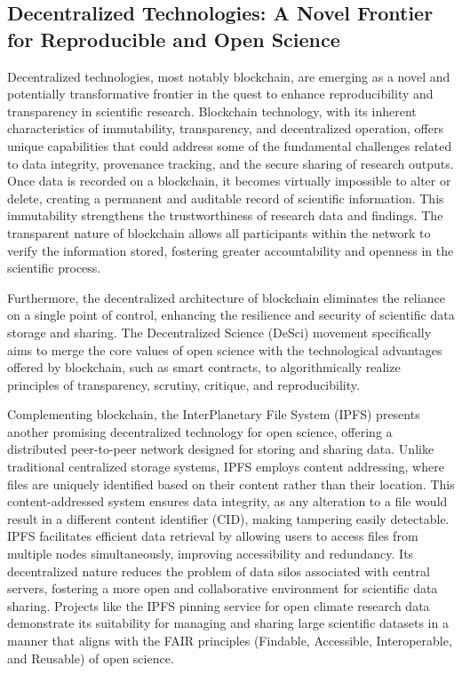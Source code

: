 \documentclass{article}
\begin{document}
\subsection{Decentralized Technologies: A Novel Frontier for Reproducible and Open Science}

Decentralized technologies, most notably blockchain, are emerging as a novel and potentially transformative frontier in the quest to enhance reproducibility and transparency in scientific research. Blockchain technology, with its inherent characteristics of immutability, transparency, and decentralized operation, offers unique capabilities that could address some of the fundamental challenges related to data integrity, provenance tracking, and the secure sharing of research outputs. Once data is recorded on a blockchain, it becomes virtually impossible to alter or delete, creating a permanent and auditable record of scientific information. This immutability strengthens the trustworthiness of research data and findings. The transparent nature of blockchain allows all participants within the network to verify the information stored, fostering greater accountability and openness in the scientific process.

Furthermore, the decentralized architecture of blockchain eliminates the reliance on a single point of control, enhancing the resilience and security of scientific data storage and sharing. The Decentralized Science (DeSci) movement specifically aims to merge the core values of open science with the technological advantages offered by blockchain, such as smart contracts, to algorithmically realize principles of transparency, scrutiny, critique, and reproducibility.

Complementing blockchain, the InterPlanetary File System (IPFS) presents another promising decentralized technology for open science, offering a distributed peer-to-peer network designed for storing and sharing data. Unlike traditional centralized storage systems, IPFS employs content addressing, where files are uniquely identified based on their content rather than their location. This content-addressed system ensures data integrity, as any alteration to a file would result in a different content identifier (CID), making tampering easily detectable. IPFS facilitates efficient data retrieval by allowing users to access files from multiple nodes simultaneously, improving accessibility and redundancy. Its decentralized nature reduces the problem of data silos associated with central servers, fostering a more open and collaborative environment for scientific data sharing. Projects like the IPFS pinning service for open climate research data demonstrate its suitability for managing and sharing large scientific datasets in a manner that aligns with the FAIR principles (Findable, Accessible, Interoperable, and Reusable) of open science.
\end{document}
